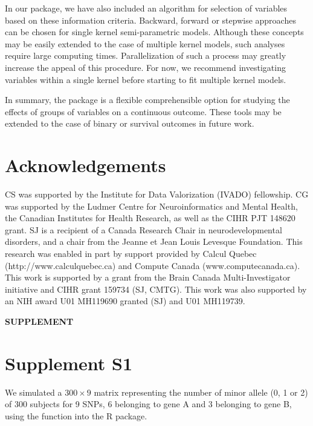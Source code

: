 In our  package, we have also included an algorithm for selection of variables based on these information criteria. Backward, forward or stepwise approaches can be chosen for single kernel semi-parametric models. Although these concepts may be easily extended to the case of multiple kernel models, such analyses require large computing times. Parallelization of such a process may greatly increase the appeal of this  procedure. For now, we recommend investigating variables within a single kernel before starting to fit multiple kernel models. 

In summary, the  package is a flexible comprehensible option for studying the effects of groups of variables on a continuous outcome. These tools may be extended to the case of binary or survival outcomes in future work. 


\section{Acknowledgements}

CS  was  supported  by  the  Institute  for  Data  Valorization  (IVADO)  fellowship. CG was supported by the Ludmer Centre for Neuroinformatics and Mental Health, the Canadian Institutes for Health Research, as well as the CIHR PJT 148620 grant. SJ is a recipient of a Canada Research Chair in neurodevelopmental disorders, and a chair from the Jeanne et Jean Louis Levesque Foundation. This research was enabled in part by support provided by Calcul Quebec (http://www.calculquebec.ca) and Compute Canada (www.computecanada.ca). This work is supported by a grant from the Brain Canada Multi-Investigator initiative and CIHR grant 159734 (SJ, CMTG).  This work was also supported by an NIH award U01 MH119690 granted (SJ) and U01 MH119739.



\newpage

\begin{center}
    \textbf{SUPPLEMENT}
\end{center}

\section{Supplement S1}

We simulated a $300 \times 9$ matrix representing the number of minor allele (0, 1 or 2) of 300 subjects for 9 SNPs, 6 belonging to gene A and 3 belonging to gene B, using the  function into the  R package. 

